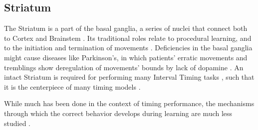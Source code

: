     \subsection{Striatum}
        The Striatum is a part of the basal ganglia, a series of nuclei that connect both to Cortex and Brainstem \cite{helie2015learning}. 
        Its traditional roles relate to procedural learning, and to the initiation and termination of movements \cite{helie2015learning}. Deficiencies in the basal ganglia might cause diseases like Parkinson's, in which patients' erratic movements and tremblings show deregulation of movements' bounds by lack of dopamine \cite{buhusi2005makes}. An intact Striatum is required for performing many Interval Timing tasks \cite{mello2015scalable,gouvea2015striatal,cho2010differential}, such that it is the centerpiece of many timing models \cite{mello2015scalable, buhusi2005makes}.
    
        While much has been done in the context of timing performance, the mechanisms through which the correct behavior develops during learning are much less studied \cite{van20168}.
